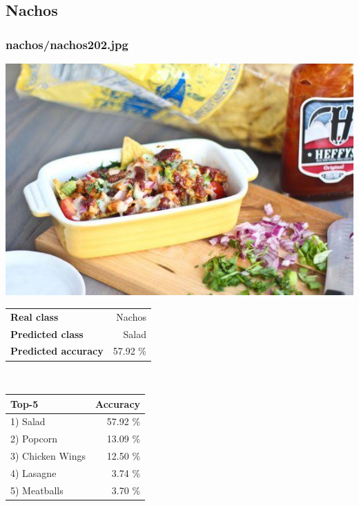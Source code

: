 \subsection{Nachos}
    
\subsubsection{nachos/nachos202.jpg}

\begin{minipage}[t]{0.4\textwidth}
	\vspace{0pt}
	\includegraphics[width=\linewidth]{images/evaluation-images/nachos/nachos202.jpg}
\end{minipage}
\hfill
\begin{minipage}[t]{0.5\textwidth}
	\vspace{0pt}\raggedright
	\begin{tabularx}{\textwidth}{X r}
		\small \textbf{Real class} & \small Nachos\\
		\small \textbf{Predicted class} & \small Salad\\
		\small \textbf{Predicted accuracy} & \small 57.92 \%
    \end{tabularx}\\
    
    \vspace{6pt}
	\begin{tabularx}{\textwidth}{X r}
        \small \textbf{Top-5} & \small \textbf{Accuracy} \\
        \hline
		\small 1) Salad & \small 57.92 \%\\\small 2) Popcorn & \small 13.09 \%\\\small 3) Chicken Wings & \small 12.50 \%\\\small 4) Lasagne & \small 3.74 \%\\\small 5) Meatballs & \small 3.70 \%
    \end{tabularx}
\end{minipage}
    
